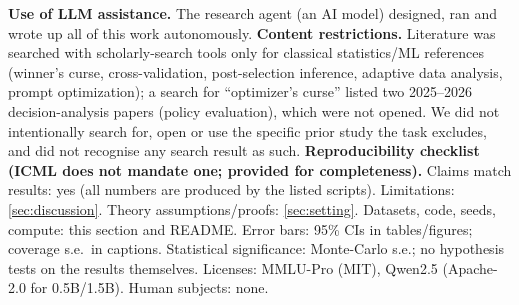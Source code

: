 \textbf{Use of LLM assistance.} The research agent (an AI model) designed, ran and wrote up all of this work autonomously. \textbf{Content restrictions.} Literature was searched with scholarly-search tools only for classical statistics/ML references (winner's curse, cross-validation, post-selection inference, adaptive data analysis, prompt optimization); a search for ``optimizer's curse'' listed two 2025--2026 decision-analysis papers (policy evaluation), which were not opened. We did not intentionally search for, open or use the specific prior study the task excludes, and did not recognise any search result as such.
\textbf{Reproducibility checklist (ICML does not mandate one; provided for completeness).} Claims match results: yes (all numbers are produced by the listed scripts). Limitations: \cref{sec:discussion}. Theory assumptions/proofs: \cref{sec:setting}. Datasets, code, seeds, compute: this section and README. Error bars: 95\% CIs in tables/figures; coverage s.e.\ in captions. Statistical significance: Monte-Carlo s.e.; no hypothesis tests on the results themselves. Licenses: MMLU-Pro (MIT), Qwen2.5 (Apache-2.0 for 0.5B/1.5B). Human subjects: none.
